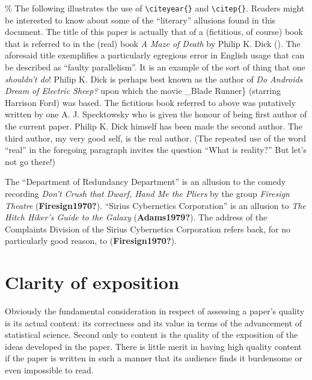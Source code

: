 \documentclass[
  times,
  doublespace]{anzsauth}
\begin{document}
\% The following illustrates the use of
\texttt{\textbackslash{}citeyear\{\}} and
\texttt{\textbackslash{}citep\{\}}. Readers might be interested to know
about some of the ``literary'' allusions found in this document. The
title of this paper is actually that of a (fictitious, of course) book
that is referred to in the (real) book \emph{A Maze of Death} by Philip
K. Dick (\citeyear{Dick1971}). The aforesaid title exemplifies a
particularly egregious error in English usage that can be described as
``faulty parallelism''. It is an example of the sort of thing that one
\emph{shouldn't do}! Philip K. Dick is perhaps best known as the author
of \emph{Do Androids Dream of Electric Sheep?} \citep{Dick1968} upon
which the movie \_Blade Runner\} (starring Harrison Ford) was based. The
fictitious book referred to above was putatively written by one A. J.
Specktowsky who is given the honour of being first author of the current
paper. Philip K. Dick himself has been made the second author. The third
author, my very good self, is the real author. (The repeated use of the
word ``real'' in the foregoing paragraph invites the question ``What is
reality?'' But let's not go there!)

The ``Department of Redundancy Department'' is an allusion to the comedy
recording \emph{Don't Crush that Dwarf, Hand Me the Pliers} by the group
\emph{Firesign Theatre} (\textbf{Firesign1970?}). ``Sirius Cybernetics
Corporation'' is an allusion to \emph{The Hitch Hiker's Guide to the
Galaxy} (\textbf{Adams1979?}). The address of the Complaints Division of
the Sirius Cybernetics Corporation refers back, for no particularly good
reason, to (\textbf{Firesign1970?}).

\section{Clarity of exposition}\label{sec:clarExpos}

Obviously the fundamental consideration in respect of assessing a
paper's quality is its actual content: its correctness and its value in
terms of the advancement of statistical science. Second only to content
is the quality of the exposition of the ideas developed in the paper.
There is little merit in having high quality content if the paper is
written in such a manner that its audience finds it burdensome or even
impossible to read.
\end{document}
